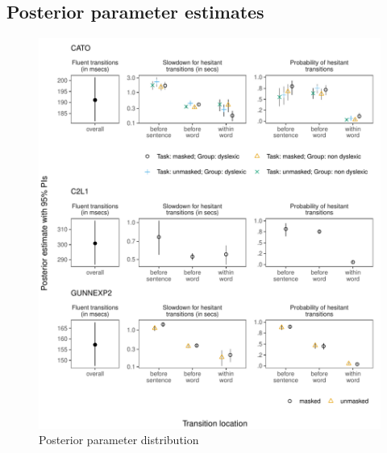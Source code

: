 \documentclass[
  english,
  man,floatsintext]{apa7}
\begin{document}
\clearpage
\makeatletter
\efloat@restorefloats
\makeatother


\begin{appendix}
\section{}
\hypertarget{posterior-parameter-estimates}{%
\subsection{Posterior parameter
estimates}\label{posterior-parameter-estimates}}

\begin{figure}[!htb]
\centering
\includegraphics{figures/psplots1constr.pdf}
\caption{Posterior parameter distribution}
\end{figure}
\newpage
\begin{figure}[!htb]
\ContinuedFloat
\captionsetup{list=off,format=cont}
\centering

\end{figure}
\end{appendix}
\end{document}
